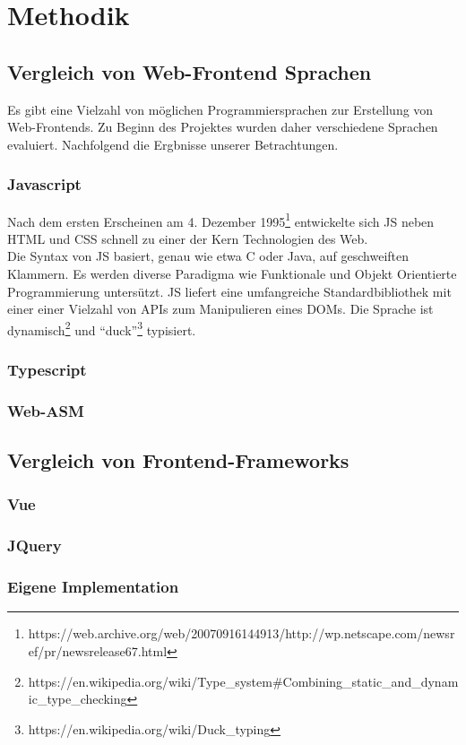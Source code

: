 \chapter{Methodik}
\section{Vergleich von Web-Frontend Sprachen}
Es gibt eine Vielzahl von möglichen Programmiersprachen zur Erstellung von
Web-Frontends. Zu Beginn des Projektes wurden daher verschiedene Sprachen
evaluiert. Nachfolgend die Ergbnisse unserer Betrachtungen.
\subsection{Javascript}
Nach dem ersten Erscheinen am 4. Dezember
1995\footnote{https://web.archive.org/web/20070916144913/http://wp.netscape.com/newsref/pr/newsrelease67.html}
entwickelte sich \ac{JS} neben \ac{HTML} und \ac{CSS} schnell zu einer der Kern
Technologien des Web.\\
Die Syntax von \ac{JS} basiert, genau wie etwa C oder
Java, auf geschweiften Klammern. Es werden diverse Paradigma wie Funktionale und
Objekt Orientierte Programmierung untersützt. \acl{JS} liefert eine umfangreiche
Standardbibliothek mit einer einer Vielzahl von
\ac{API}s zum Manipulieren eines \ac{DOM}s. Die Sprache ist dynamisch\footnote{https://en.wikipedia.org/wiki/Type\_system\#Combining\_static\_and\_dynamic\_type\_checking} und
``duck''\footnote{https://en.wikipedia.org/wiki/Duck\_typing} typisiert. %
\subsection{Typescript}
\subsection{Web-ASM}
\section{Vergleich von Frontend-Frameworks}
\subsection{Vue}
\subsection{JQuery}
\subsection{Eigene Implementation}

